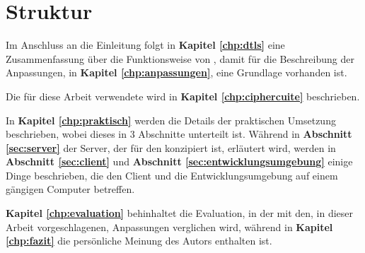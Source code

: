 \section{Struktur}

Im Anschluss an die Einleitung folgt in \textbf{Kapitel \ref{chp:dtls}} eine Zusammenfassung
über die Funktionsweise von , damit für die Beschreibung der Anpassungen,
in \textbf{Kapitel \ref{chp:anpassungen}}, eine Grundlage vorhanden ist.

Die für diese Arbeit verwendete  wird in \textbf{Kapitel \ref{chp:ciphercuite}} beschrieben.

In \textbf{Kapitel \ref{chp:praktisch}} werden die Details der praktischen Umsetzung beschrieben, wobei
dieses in 3 Abschnitte unterteilt ist. Während in \textbf{Abschnitt \ref{sec:server}} der Server, der für den
 konzipiert ist, erläutert wird, werden in \textbf{Abschnitt \ref{sec:client}} und
\textbf{Abschnitt \ref{sec:entwicklungsumgebung}} einige Dinge beschrieben, die den Client und
die Entwicklungsumgebung auf einem gängigen Computer betreffen.

\textbf{Kapitel \ref{chp:evaluation}} behinhaltet die Evaluation, in der  mit den, in
dieser Arbeit vorgeschlagenen, Anpassungen verglichen wird, während in \textbf{Kapitel \ref{chp:fazit}}
die persönliche Meinung des Autors enthalten ist.